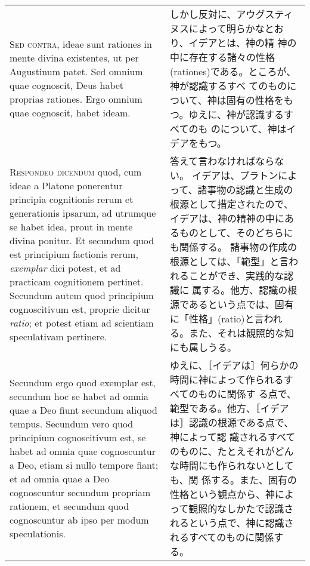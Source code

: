 \documentclass[10pt]{jsarticle} %
\begin{document}
\begin{longtable}{p{21em}p{21em}}
\\


{\scshape  Sed contra}, ideae sunt rationes in mente
divina existentes, ut per Augustinum patet. Sed omnium quae cognoscit,
Deus habet proprias rationes. Ergo omnium quae cognoscit, habet ideam.


&
しかし反対に、アウグスティヌスによって明らかなとおり、イデアとは、神の精
 神の中に存在する諸々の性格(rationes)である。ところが、神が認識するすべ
 てのものについて、神は固有の性格をもつ。ゆえに、神が認識するすべてのも
 のについて、神はイデアをもつ。

\\


{\scshape Respondeo dicendum} quod, cum ideae a Platone ponerentur
principia cognitionis rerum et generationis ipsarum, ad utrumque se
habet idea, prout in mente divina ponitur. Et secundum quod est
principium factionis rerum, {\itshape exemplar} dici potest, et ad
practicam cognitionem pertinet. Secundum autem quod principium
cognoscitivum est, proprie dicitur {\itshape ratio}; et potest etiam ad
scientiam speculativam pertinere. 


&

答えて言わなければならない。
イデアは、プラトンによって、諸事物の認識と生成の根源として措定されたので、
 イデアは、神の精神の中にあるものとして、そのどちらにも関係する。
諸事物の作成の根源としては、「範型」と言われることができ、実践的な認識に
 属する。他方、認識の根源であるという点では、固有に「性格」(ratio)と言われ
 る。また、それは観照的な知にも属しうる。

\\


Secundum ergo quod exemplar est,
secundum hoc se habet ad omnia quae a Deo fiunt secundum aliquod
tempus. Secundum vero quod principium cognoscitivum est, se habet ad
omnia quae cognoscuntur a Deo, etiam si nullo tempore fiant; et ad omnia
quae a Deo cognoscuntur secundum propriam rationem, et secundum quod
cognoscuntur ab ipso per modum speculationis.


&

ゆえに、［イデアは］何らかの時間に神によって作られるすべてのものに関係す
 る点で、範型である。他方、［イデアは］認識の根源である点で、神によって認
 識されるすべてのものに、たとえそれがどんな時間にも作られないとしても、関
 係する。また、固有の性格という観点から、神によって観照的なしかたで認識さ
 れるという点で、神に認識されるすべてのものに関係する。

\\



\end{longtable}
\end{document}

